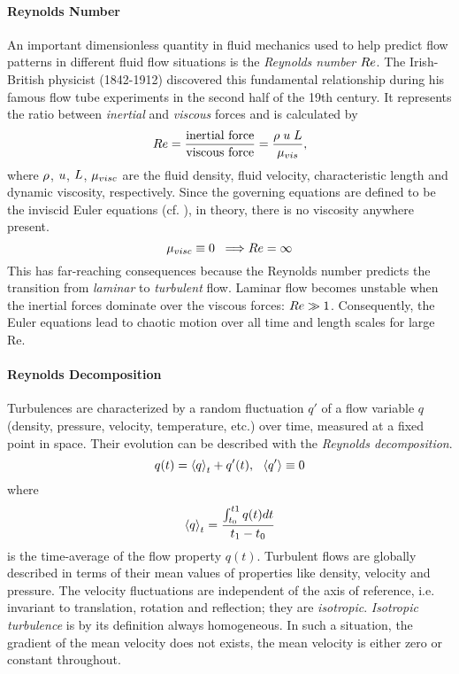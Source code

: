 \paragraph{Reynolds Number}
An important dimensionless quantity in fluid mechanics used to help predict
flow patterns in different fluid flow situations is the \emph{Reynolds number}
$Re$. The Irish-British physicist  (1842-1912)
discovered this fundamental relationship during his famous flow tube
experiments in the second half of the 19th century. It represents the ratio
between \emph{inertial} and \emph{viscous} forces and is calculated by
\begin{equation}
\label{eqn:reynold}
    Re = \frac{\text{inertial force}}{\text{viscous force}} = \frac{\rho\;u\;L}{\mu_{vis}},
\end{equation}
where $\rho$, $u$, $L$, $\mu_{visc}$ are the fluid density,
fluid velocity, characteristic length and dynamic viscosity, respectively.
Since the governing equations are defined to be the inviscid Euler equations
(cf. ), in theory, there is no viscosity anywhere present.
\begin{equation}
\label{eqn:no-viscosity}
    \mu_{visc} \equiv 0 \;\; \Longrightarrow Re = \infty
\end{equation}
This has far-reaching consequences because the Reynolds number predicts the
transition from \emph{laminar} to \emph{turbulent} flow. Laminar flow becomes
unstable when the inertial forces dominate over the viscous forces: $Re
\gg 1$. Consequently, the Euler equations lead to chaotic motion over all time and
length scales for large Re.

\paragraph{Reynolds Decomposition}
Turbulences are characterized by a random fluctuation $q'$ of a flow variable $q$
(density, pressure, velocity, temperature, etc.) over time, measured at a
fixed point in space. Their evolution can be described with the \emph{Reynolds
decomposition}.
\begin{equation}
    q(t) = \left\langle q\right\rangle_t + q'(t), \ \ \left\langle q'\right\rangle \equiv 0
\end{equation}
where 
\begin{equation}
    \left\langle q\right\rangle_t = \frac{\int_{t_0}^{t1} q(t) dt}{t_1 - t_0}
\end{equation}
is the time-average of the flow property $q(t)$.  Turbulent flows are globally
described in terms of their mean values of properties like density, velocity
and pressure. The velocity fluctuations are independent of the axis of
reference, i.e. invariant to translation, rotation and reflection; they are
\emph{isotropic}. \emph{Isotropic turbulence} is by its definition always
homogeneous. In such a situation, the gradient of the mean velocity does not
exists, the mean velocity is either zero or constant throughout.

